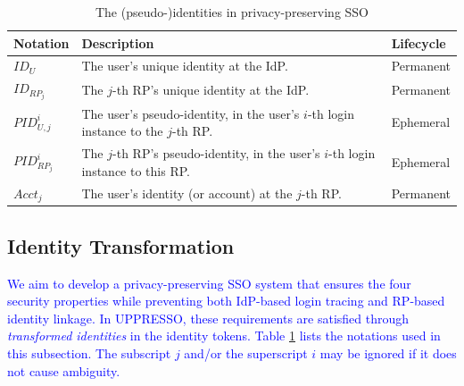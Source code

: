 \begin{table}
\footnotesize
    \caption{The (pseudo-)identities in privacy-preserving SSO}
    \centering
    \begin{tabular}{|p{1.0cm}|p{5.1cm}|p{1.13cm}|} \hline
    {\textbf{Notation}} & {\textbf{Description}} & {\textbf{Lifecycle}} \\ \hline
    {$ID_U$} & {The user's unique identity at the IdP.} & {Permanent} \\ \hline
    {$ID_{RP_j}$} & {The $j$-th RP's unique identity at the IdP.} & {Permanent} \\ \hline
    {$PID_{U,j}^i$} & {The user's pseudo-identity, in the user's $i$-th login instance to the $j$-th RP.} & {Ephemeral} \\ \hline
    {$PID_{RP_j}^i$} & {The $j$-th RP's pseudo-identity, in the user's $i$-th login instance to this RP.} & {Ephemeral} \\ \hline
    {$Acct_j$} & {The user's identity (or account) at the $j$-th RP.} & {Permanent} \\ \hline
    \end{tabular}
    \label{tbl:notations-dilemma}
\end{table}

\subsection{Identity Transformation}
\label{subsec:solutions}

\textcolor{blue}{We aim to develop a privacy-preserving SSO system that ensures the four security properties while preventing both IdP-based login tracing and RP-based identity linkage.
In UPPRESSO, these requirements are satisfied through \emph{transformed identities} in the identity tokens. Table \ref{tbl:notations-dilemma} lists the notations used in this subsection. The subscript $j$ and/or the superscript $i$ may be ignored if it does not cause ambiguity.}

